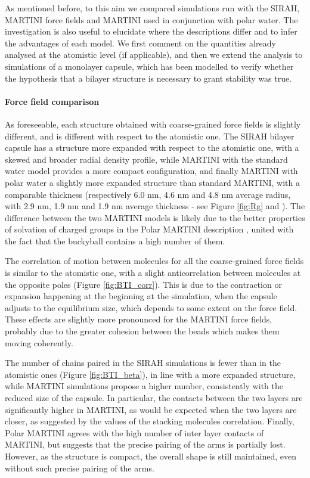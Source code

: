 As mentioned before, to this aim we compared simulations run with the SIRAH, MARTINI force fields and MARTINI used in conjunction with polar water. The investigation is also useful to elucidate where the descriptions differ and to infer the advantages of each model.
%
We first comment on the quantities already analysed at the atomistic level (if applicable), and then we extend the analysis to simulations of a monolayer capsule, which has been modelled to verify whether the hypothesis that a bilayer structure is necessary to grant stability was true.

\paragraph{Force field comparison}
As foreseeable, each structure obtained with coarse-grained force fields is slightly different, and is different with respect to the atomistic one.
%
The SIRAH bilayer capsule has a structure more expanded with respect to the atomistic one, with a skewed and broader radial density profile, while MARTINI with the standard water model provides a more compact configuration, and finally MARTINI with polar water a slightly more expanded structure than standard MARTINI, with a comparable thickness (respectively 6.0 nm, 4.6 nm and 4.8 nm average radius, with 2.9 nm, 1.9 nm and 1.9 nm average thickness - see Figure \ref{fig:Rg} and ).
%
The difference between the two MARTINI models is likely due to the better properties of solvation of charged groups in the Polar MARTINI description \citep{Yesylevskyy2010}, united with the fact that the buckyball contains a high number of them.

The correlation of motion between molecules for all the coarse-grained force fields is similar to the atomistic one, with a slight anticorrelation between molecules at the opposite poles (Figure \ref{fig:BTI_corr}). This is due to the contraction or expansion happening at the beginning at the simulation, when the capsule adjusts to the equilibrium size, which depends to some extent on the force field.
%
These effects are slightly more pronounced for the MARTINI force fields, probably due to the greater cohesion between the beads which makes them moving coherently.

The number of chains paired in the SIRAH simulations is fewer than in the atomistic ones (Figure \ref{fig:BTI_beta}), in line with a more expanded structure, while MARTINI simulations propose a higher number, consistently with the reduced size of the capsule. In particular, the contacts between the two layers are significantly higher in MARTINI, as would be expected when the two layers are closer, as suggested by the values of the stacking molecules correlation. Finally, Polar MARTINI agrees with the high number of inter layer contacts of MARTINI, but suggests that the precise pairing of the arms is partially lost. However, as the structure is compact, the overall shape is still maintained, even without such precise pairing of the arms.

